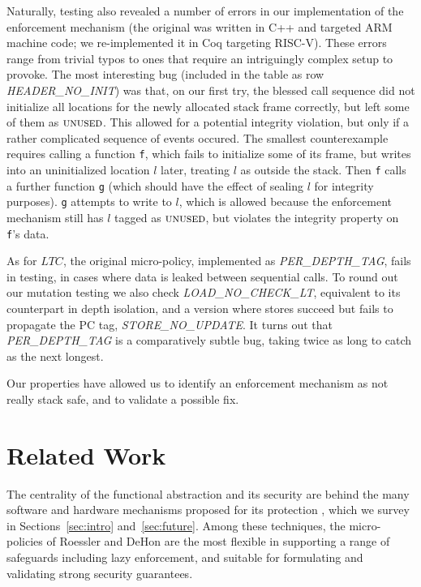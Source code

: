 \documentclass[10pt,conference]{ieeetran}%
\theoremstyle{definition}
\begin{document}
Naturally, testing also revealed a number of errors in our
implementation of the enforcement mechanism (the original was written in C++
and targeted ARM machine code;
we re-implemented it in Coq targeting RISC-V).  These errors range
from trivial typos to ones that require an intriguingly complex setup
to provoke.  The most interesting bug (included in the table as row
{\em HEADER\_NO\_INIT}) was that, on our first try, the blessed call
sequence %
did not initialize all locations for the
newly allocated stack frame correctly, but left some of them as
$\textsc{unused}$. This allowed for a potential integrity violation, but
only if a rather complicated sequence of events occured.
The smallest counterexample requires calling a function {\tt f},
which fails to initialize some of its frame,
but writes into an uninitialized location $l$ later, treating \(l\) as outside
the stack. Then {\tt f} calls a further function {\tt g} (which should have
the effect of sealing $l$ for integrity purposes). {\tt g} attempts to write to $l$,
which is allowed because the enforcement mechanism still has
$l$ tagged as $\textsc{unused}$, but violates the integrity property on {\tt f}'s data.

As for \(LTC\), the original micro-policy, implemented as {\em PER\_DEPTH\_TAG},
fails in testing, in cases where data is leaked between sequential calls.
To round out our mutation testing we also check {\em LOAD\_NO\_CHECK\_LT},
equivalent to its counterpart in depth isolation,
and a version where stores succeed but fails to propagate the PC tag, {\em STORE\_NO\_UPDATE}.
It turns out that {\em PER\_DEPTH\_TAG} is a comparatively subtle bug,
taking twice as long to catch as the next longest.

Our properties have allowed us to identify an enforcement mechanism as
not really stack safe, and to validate a possible fix.

\section{Related Work}
\label{sec:relwork}

The centrality of the functional abstraction and its security are behind the
many software and hardware mechanisms proposed for its protection
\cite{Cowan+98, NagarakatteZMZ09, NagarakatteZMZ10, DeviettiBMZ08,
Kuznetsov+14, Dang+15, Shanbhogue+19, Woodruff+14, Chisnall+15,
SkorstengaardLocal, SkorstengaardSTKJFP, Georges22:TempsDesCerises,
DBLP:conf/sp/RoesslerD18, Gollapudi+23}, which we survey in
Sections~\ref{sec:intro} and~\ref{sec:future}. Among these techniques, the micro-policies of Roessler and
DeHon \cite{DBLP:conf/sp/RoesslerD18} are the most flexible in supporting a
range of safeguards including lazy enforcement, and suitable for formulating
and validating strong security guarantees.
\end{document}

